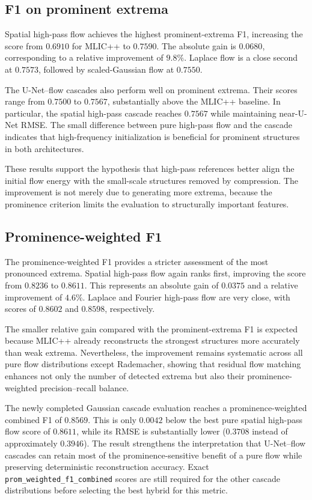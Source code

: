 \documentclass[11pt]{article}
\begin{document}
\subsection{F1 on prominent extrema}

Spatial high-pass flow achieves the highest prominent-extrema F1, increasing the score from $0.6910$ for MLIC++ to $0.7590$. The absolute gain is $0.0680$, corresponding to a relative improvement of $9.8\%$. Laplace flow is a close second at $0.7573$, followed by scaled-Gaussian flow at $0.7550$.

The U-Net--flow cascades also perform well on prominent extrema. Their scores range from $0.7500$ to $0.7567$, substantially above the MLIC++ baseline. In particular, the spatial high-pass cascade reaches $0.7567$ while maintaining near-U-Net RMSE. The small difference between pure high-pass flow and the cascade indicates that high-frequency initialization is beneficial for prominent structures in both architectures.

These results support the hypothesis that high-pass references better align the initial flow energy with the small-scale structures removed by compression. The improvement is not merely due to generating more extrema, because the prominence criterion limits the evaluation to structurally important features.

\subsection{Prominence-weighted F1}

The prominence-weighted F1 provides a stricter assessment of the most pronounced extrema. Spatial high-pass flow again ranks first, improving the score from $0.8236$ to $0.8611$. This represents an absolute gain of $0.0375$ and a relative improvement of $4.6\%$. Laplace and Fourier high-pass flow are very close, with scores of $0.8602$ and $0.8598$, respectively.

The smaller relative gain compared with the prominent-extrema F1 is expected because MLIC++ already reconstructs the strongest structures more accurately than weak extrema. Nevertheless, the improvement remains systematic across all pure flow distributions except Rademacher, showing that residual flow matching enhances not only the number of detected extrema but also their prominence-weighted precision--recall balance.

The newly completed Gaussian cascade evaluation reaches a prominence-weighted combined F1 of $0.8569$. This is only $0.0042$ below the best pure spatial high-pass flow score of $0.8611$, while its RMSE is substantially lower ($0.3708$ instead of approximately $0.3946$). The result strengthens the interpretation that U-Net--flow cascades can retain most of the prominence-sensitive benefit of a pure flow while preserving deterministic reconstruction accuracy. Exact \nolinkurl{prom_weighted_f1_combined} scores are still required for the other cascade distributions before selecting the best hybrid for this metric.
\end{document}
